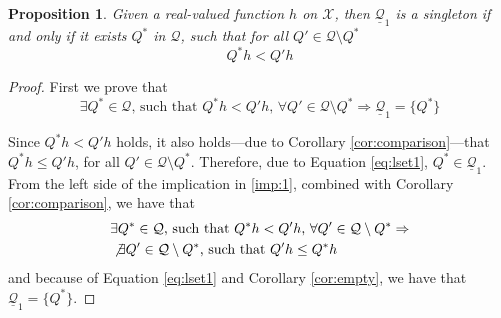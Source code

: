 \documentclass{article}
\newcommand{\statessymbol}{\mathcal{X}}
\newcommand{\matrices}{\mathcal{Q}}
\newcommand{\lmatrixi}[1]{\underline{\matrices}_{#1}}
\newcommand{\stateset}{\statessymbol}
\newtheorem{Proposition}{Proposition}
\begin{document}
\begin{Proposition} \label{prop:singleton}
Given a real-valued function $h$ on $\stateset$, then $\lmatrixi{1}$ is a singleton if and only if it exists $ Q^{*}$ in $\matrices$, such that for all $ Q ' \in\matrices\setminus Q^{*}$
\begin{equation*}
 Q^{*}h< Q'h
\end{equation*} 
\end{Proposition}
\begin{proof}
First we prove that 
\begin{equation} \label{imp:1}
\exists Q^{*}\in\matrices\text{, such that } Q^{*}h< Q'h\text{, }\forall Q ' \in\matrices\setminus Q^{*}\Rightarrow \lmatrixi{1}=\{ Q^{*}\}
\end{equation}

\noindent
Since $ Q^{*}h< Q'h$ holds, it also holds---due to Corollary \ref{cor:comparison}---that $ Q^{*}h \leq Q'h$, for all $ Q ' \in\matrices\setminus Q^{*}$.
Therefore, due to Equation \eqref{eq:lset1}, $ Q^{*}\in\lmatrixi{1}$.
From the left side of the implication in \eqref{imp:1}, combined with Corollary \ref{cor:comparison}, we have that 
\begin{equation} \label{imp:2}
\begin{split}
&\exists Q^{*}\in\matrices\text{, such that } Q^{*}h< Q'h\text{, }\forall Q ' \in\matrices\setminus Q^{*}\Rightarrow \\
&\not\exists Q'\in\matrices\setminus Q^{*}\text{, such that } Q'h\leq Q^{*}h
\end{split}
\end{equation}
and because of Equation \eqref{eq:lset1} and Corollary \ref{cor:empty}, we have that $\lmatrixi{1}=\{ Q^{*}\}$.



\end{proof}
\end{document}
